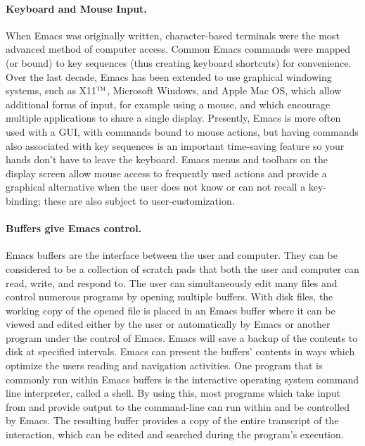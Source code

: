 \documentclass{article}
\newcommand*{\tm}{$^{\mbox{\scriptsize\sc tm}}$}
\begin{document}
\paragraph{Keyboard and Mouse Input.}
When Emacs was originally written, character-based terminals were the
most advanced method of computer access.  Common Emacs commands were
mapped (or bound) to key sequences (thus creating keyboard shortcuts)
for convenience.
Over the
last decade, Emacs has been extended to use graphical windowing
systems, such as X11\tm, Microsoft Windows, and Apple Mac OS, which
allow additional forms of input, for example using a mouse, and which
encourage multiple applications to share a single display.  Presently,
Emacs is more often used with a GUI, with commands bound to mouse
actions, but having commands also associated with key sequences
is an important time-saving feature so your hands don't have to leave 
the keyboard.
Emacs menus and toolbars on the display screen allow mouse access to
frequently used actions and provide a graphical alternative when the
user does not know or can not recall a key-binding; these are also
subject to user-customization.

\paragraph{Buffers give Emacs control.}
Emacs buffers are the interface between the user and computer.  They
can be considered to be a collection of scratch pads that both the
user and computer can read, write, and respond to.  The user can
simultaneously edit many files and control numerous programs by
opening multiple buffers.  With disk files, the working copy of
the opened file is placed in an Emacs buffer where it can be viewed
and edited either by the user or automatically by Emacs or another
program under the control of Emacs.  Emacs will save a backup of the
contents to disk at specified intervals.
Emacs can present the buffers'
contents in ways which optimize the users reading and navigation
activities.  One program that is commonly run within Emacs buffers is
the interactive operating system command line interpreter, called a
shell.  By using this, most programs which take input from and provide
output to the command-line can run within and be controlled by Emacs.
The resulting buffer provides a copy of the entire transcript of the
interaction, which can be edited and searched during the program's
execution.
\end{document}
